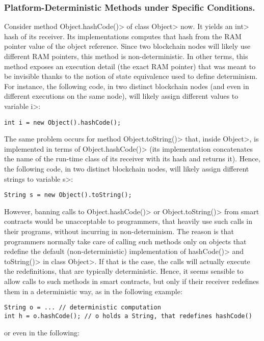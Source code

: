\subsubsection*{Platform-Deterministic Methods under Specific Conditions.}
Consider method \<Object.hashCode()> of class \<Object> now. It yields an \<int>
hash of its receiver. Its implementations computes that hash from the
RAM pointer value of the object reference.
Since two blockchain nodes will likely use different RAM pointers,
this method is non-deterministic.
In other terms, this method exposes an execution detail (the exact RAM pointer)
that was meant to be invisible thanks to the notion of state equivalence used
to define determinism.
For instance, the following code, in two distinct blockchain nodes
(and even in different executions on the same node),
will likely assign different values to variable \<i>:
%
\begin{verbatim}
int i = new Object().hashCode();
\end{verbatim}
%
The same problem occurs for method \<Object.toString()> that, inside
\<Object>, is implemented in terms of \<Object.hashCode()> (its
implementation concatenates
the name of the run-time class of its receiver with its hash and returns it).
Hence, the following code, in two distinct blockchain nodes,
will likely assign different strings to variable \<s>:
%
\begin{verbatim}
String s = new Object().toString();
\end{verbatim}
%
However, banning calls to \<Object.hashCode()> or \<Object.toString()>
from smart contracts would be unacceptable to programmers, that
heavily use such calls in their programs, without incurring in
non-determinism. The reason is that programmers normally
take care of calling such methods only on objects that redefine
the default (non-deterministic) implementation of
\<hashCode()> and \<toString()> in class \<Object>.
If that is the case, the calls will actually
execute the redefinitions, that are typically deterministic. Hence, it seems sensible
to allow calls to such methods in smart contracts, but only if their receiver
redefines them in a deterministic way, as in the following example:

{\small
\begin{verbatim}
String o = ... // deterministic computation
int h = o.hashCode(); // o holds a String, that redefines hashCode()
\end{verbatim}}

\noindent
or even in the following:

